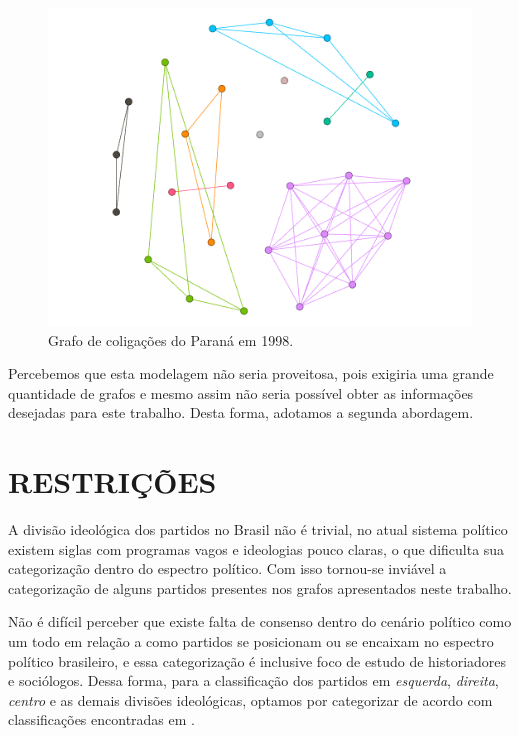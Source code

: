 \begin{figure}[H]
\centering
\includegraphics[width=1\textwidth]{img/parana-1998.png}
\caption{Grafo de coligações do Paraná em 1998.}
\end{figure}

Percebemos que esta modelagem não seria proveitosa, pois exigiria uma grande quantidade de grafos e mesmo assim não seria possível obter as informações desejadas para este trabalho. Desta forma, adotamos a segunda abordagem.

\section{\texorpdfstring{\MakeUppercase{Restrições}}{}}
\label{proposta__restricoes}

A divisão ideológica dos partidos no Brasil não é trivial, no atual sistema político existem siglas com programas vagos e ideologias pouco claras, o que dificulta sua categorização dentro do espectro político. Com isso tornou-se inviável a categorização de alguns partidos presentes nos grafos apresentados neste trabalho.

Não é difícil perceber que existe falta de consenso dentro do cenário político como um todo em relação a como partidos se posicionam ou se encaixam no espectro político brasileiro, e essa categorização é inclusive foco de estudo de historiadores e sociólogos. Dessa forma, para a classificação dos partidos em \emph{esquerda}, \emph{direita}, \emph{centro} e as demais divisões ideológicas, optamos por categorizar de acordo com classificações encontradas em .

